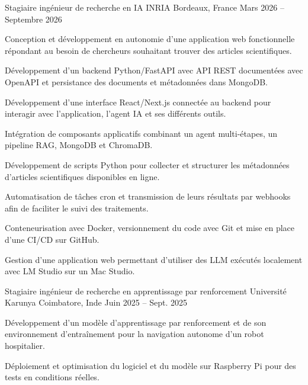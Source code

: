 
\begin{cventries}
  \cventry
    {Stagiaire ingénieur de recherche en IA}
    {INRIA}
    {Bordeaux, France}
    {Mars 2026 -- Septembre 2026}
    {
      \begin{cvitems}
        \item {Conception et développement en autonomie d’une application web fonctionnelle répondant au besoin de chercheurs souhaitant trouver des articles scientifiques.}
        \item {Développement d’un backend Python/FastAPI avec API REST documentées avec OpenAPI et persistance des documents et métadonnées dans MongoDB.}
        \item {Développement d’une interface React/Next.js connectée au backend pour interagir avec l’application, l’agent IA et ses différents outils.}
        \item {Intégration de composants applicatifs combinant un agent multi-étapes, un pipeline RAG, MongoDB et ChromaDB.}
        \item {Développement de scripts Python pour collecter et structurer les métadonnées d’articles scientifiques disponibles en ligne.}
        \item {Automatisation de tâches cron et transmission de leurs résultats par webhooks afin de faciliter le suivi des traitements.}
        \item {Conteneurisation avec Docker, versionnement du code avec Git et mise en place d’une CI/CD sur GitHub.}
        \item {Gestion d’une application web permettant d’utiliser des LLM exécutés localement avec LM Studio sur un Mac Studio.}
      \end{cvitems}
    }

  \cventry
    {Stagiaire ingénieur de recherche en apprentissage par renforcement}
    {Université Karunya}
    {Coimbatore, Inde}
    {Juin 2025 -- Sept. 2025}
    {
      \begin{cvitems}
        \item {Développement d’un modèle d’apprentissage par renforcement et de son environnement d’entraînement pour la navigation autonome d’un robot hospitalier.}
        \item {Déploiement et optimisation du logiciel et du modèle sur Raspberry Pi pour des tests en conditions réelles.}
      \end{cvitems}
    }
\end{cventries}

